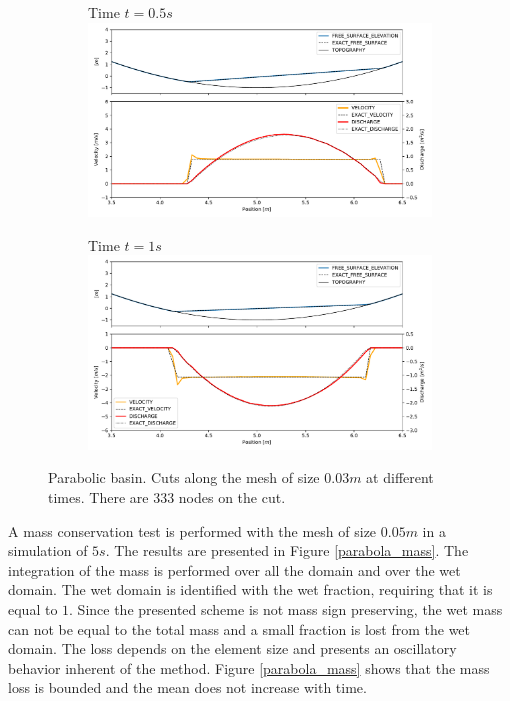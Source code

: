 \documentclass[a4paper,12pt]{elsarticle}
\begin{document}
\begin{figure}[H]
\begin{subfigure}{\textwidth}
    \centering
    Time $t=0.5s$
    \includegraphics[width=\textwidth]{img/par/parabola_t0.5.pdf}
\end{subfigure}
\par\medskip
\begin{subfigure}{\textwidth}
    \centering
    Time $t=1s$
    \includegraphics[width=\textwidth]{img/par/parabola_t1.0.pdf}
\end{subfigure}
\caption{Parabolic basin. Cuts along the mesh of size $0.03m$ at different times. There are 333 nodes on the cut.}
\label{parabola_graphic}
\end{figure}

A mass conservation test is performed with the mesh of size $0.05m$ in a simulation of $5s$. The results are presented in Figure \ref{parabola_mass}. The integration of the mass is performed over all the domain and over the wet domain. The wet domain is identified with the wet fraction, requiring that it is equal to $1$. Since the presented scheme is not mass sign preserving, the wet mass can not be equal to the total mass and a small fraction is lost from the wet domain. The loss depends on the element size and presents an oscillatory behavior inherent of the method. Figure \ref{parabola_mass} shows that the mass loss is bounded and the mean does not increase with time.
\end{document}

